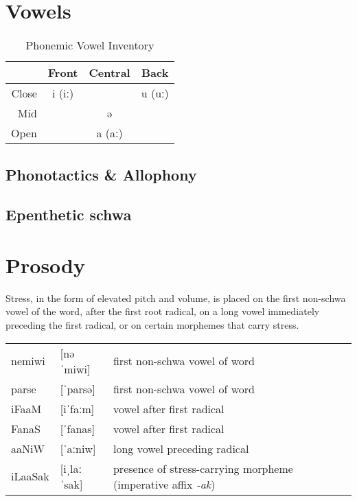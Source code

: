 \documentclass[a4paper,10pt,twoside,openright]{memoir}
\newcommand{\longv}{ː}
\newcommand\famword[1]{{\addfontfeatures{Letters=UppercaseSmallCaps}#1}}
\begin{document}
\section{Vowels}

\begin{table}[ht]
    \centering
    \begin{tabular}{rccc}
    \toprule
          & Front & Central & Back \\
    \midrule
    Close & i (i\longv{}) & & u (u\longv) \\
    Mid   & & ə & \\
    Open  & & a (a\longv) & \\
    \bottomrule
    \end{tabular}
    \caption{Phonemic Vowel Inventory}
    \label{tab:vowelinv}
\end{table}

\subsection{Phonotactics \& Allophony}

\phonr{i(\longv)}{e(\longv)}{j}

\subsection{Epenthetic schwa}

\section{Prosody}

Stress, in the form of elevated pitch and volume, is placed on the first non-schwa vowel of the word, after the first root radical, on a long vowel immediately preceding the first radical, or on certain morphemes that carry stress.

\begin{table}[ht]
    \centering
    \begin{tabular}{lll}
        nemiwi & [nəˈmiwi] & first non-schwa vowel of word\\
        parse & [ˈparsə] & first non-schwa vowel of word\\
        \famword{iFaaM} & [iˈfa{\longv}m] & vowel after first radical\\
        \famword{FanaS} & [ˈfanas] & vowel after first radical\\
        \famword{aaNiW}& [ˈa{\longv}niw] & long vowel preceding radical\\
        \famword{iLaaSak} & [iˌla{\longv}ˈsak] & presence of stress-carrying morpheme (imperative affix \emph{-ak})
    \end{tabular}
\end{table}
\end{document}

